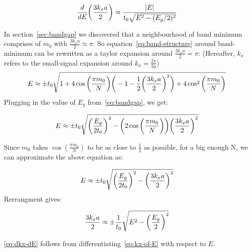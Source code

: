 \documentclass{article}
\begin{document}
\begin{equation}\label{eq:dkx-dE}
    \frac{d}{dE} \bigg{(}\frac{3k_x a}{2}\bigg{)} \approx \frac{|E|}{t_0\sqrt{E^2-(E_g/2)^2}}
\end{equation}




In section~\ref{sec:bandgap} we discovered that a neighbourhood of band minimum comprises of $m_0$ with $\frac{3k_x a}{2} \approx \pi$. 
So equation~\eqref{eq:band-structure} around band-minimum can be rewritten as a taylor expansion around $\frac{3k_x a}{2} = \pi$: 
(Hereafter, $k_x$ refers to the small-signal expansion around $k_x = \frac{2\pi}{3a}$)
\begin{equation}
    E \approx \pm t_0 \sqrt{1+4\cos\bigg{(}\frac{\pi m_0}{N}\bigg{)}\bigg{(}-1-\frac{1}{2}\bigg{(}\frac{3k_xa}{2}\bigg{)}^2\bigg{)}+4\cos^2\bigg{(}\frac{\pi m_0}{N}\bigg{)} }
\end{equation}
Plugging in the value of $E_g$ from~\eqref{eq:bandgap}, we get:

\begin{equation}
    E \approx \pm t_0 \sqrt{\bigg{(}\frac{E_g}{2t_0}\bigg{)}^2-\bigg{(}2\cos\bigg{(}\frac{\pi m_0}{N}\bigg{)}\bigg{)}\bigg{(}\frac{3k_xa}{2}\bigg{)}^2 }
\end{equation}

Since $m_0$ takes $\cos(\frac{\pi m_0}{N})$ to be as close to $\frac{1}{2}$ as possible,
for a big enough N, we can approximate the above equation as:

\begin{equation}
    E \approx \pm t_0 \sqrt{\bigg{(}\frac{E_g}{2t_0}\bigg{)}^2-\bigg{(}\frac{3k_xa}{2}\bigg{)}^2 }
\end{equation}
Rerrangment gives:

\begin{equation}\label{eq:kx-of-E}
    \frac{3k_xa}{2} \approx \pm \frac{1}{t_0}\sqrt{E^2 - \bigg{(}\frac{E_g}{2}\bigg{)}^2}
\end{equation}

\eqref{eq:dkx-dE} follows from differentiating~\eqref{eq:kx-of-E} with respect to $E$.
\end{document}
